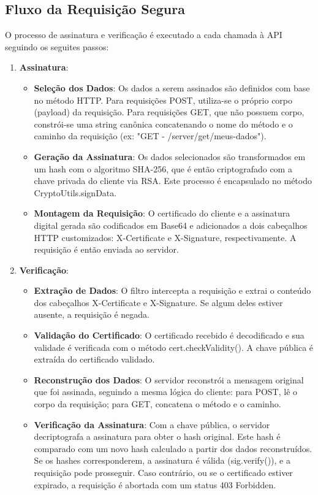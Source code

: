 \documentclass[12pt]{article}
\begin{document}
\subsection{Fluxo da Requisição Segura}
O processo de assinatura e verificação é executado a cada chamada à API seguindo os seguites passos:
\begin{enumerate}
    \item \textbf{Assinatura}:
    \begin{itemize}
        \item \textbf{Seleção dos Dados}: Os dados a serem assinados são definidos com base no método HTTP. Para requisições POST, utiliza-se o próprio corpo (payload) da requisição. Para requisições GET, que não possuem corpo, constrói-se uma string canônica concatenando o nome do método e o caminho da requisição (ex: "GET - /server/get/meus-dados").
        \item \textbf{Geração da Assinatura}: Os dados selecionados são transformados em um hash com o algoritmo SHA-256, que é então criptografado com a chave privada do cliente via RSA. Este processo é encapsulado no método CryptoUtils.signData.
        \item \textbf{Montagem da Requisição}: O certificado do cliente e a assinatura digital gerada são codificados em Base64 e adicionados a dois cabeçalhos HTTP customizados: X-Certificate e X-Signature, respectivamente. A requisição é então enviada ao servidor.
    \end{itemize}
    \item \textbf{Verificação}:
    \begin{itemize}
        \item \textbf{Extração de Dados}: O filtro intercepta a requisição e extrai o conteúdo dos cabeçalhos X-Certificate e X-Signature. Se algum deles estiver ausente, a requisição é negada.

        \item \textbf{Validação do Certificado}: O certificado recebido é decodificado e sua validade é verificada com o método cert.checkValidity(). A chave pública é extraída do certificado validado.

        \item  \textbf{Reconstrução dos Dados}: O servidor reconstrói a mensagem original que foi assinada, seguindo a mesma lógica do cliente: para POST, lê o corpo da requisição; para GET, concatena o método e o caminho.

        \item \textbf{Verificação da Assinatura}: Com a chave pública, o servidor decriptografa a assinatura para obter o hash original. Este hash é comparado com um novo hash calculado a partir dos dados reconstruídos. Se os hashes corresponderem, a assinatura é válida (sig.verify()), e a requisição pode prosseguir. Caso contrário, ou se o certificado estiver expirado, a requisição é abortada com um status 403 Forbidden.


    \end{itemize}
\end{enumerate}
\end{document}
